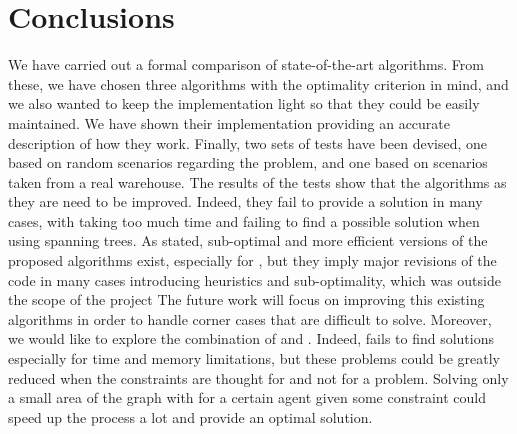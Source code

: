 \chapter{Conclusions}
\label{ch:conclusions}
We have carried out a formal comparison of state-of-the-art algorithms. From
these, we have chosen three algorithms with the optimality criterion in mind,
and we also wanted to keep the implementation light so that they could be
easily maintained. We have shown their implementation providing an accurate
description of how they work. \newline
Finally, two sets of tests have been devised, one based on random scenarios
regarding the  problem, and one based on scenarios taken from a real
warehouse. The results of the tests show that the algorithms as they are need
to be improved. Indeed, they fail to provide a solution in many cases, with
 taking too much time and  failing to find a possible
solution when using spanning trees. As stated, sub-optimal and more efficient
versions of the proposed algorithms exist, especially for , but they
imply major revisions of the code in many cases introducing heuristics and
sub-optimality, which was outside the scope of the project \newline
The future work will focus on improving this existing algorithms in order to
handle corner cases that are difficult to solve. Moreover, we would like to
explore the combination of  and . Indeed,  fails to
find solutions especially for time and memory limitations, but these problems
could be greatly reduced when the constraints are thought for  and
not for a  problem. Solving only a small area of the graph with
 for a certain agent given some constraint could speed up the
 process a lot and provide an optimal solution. 
